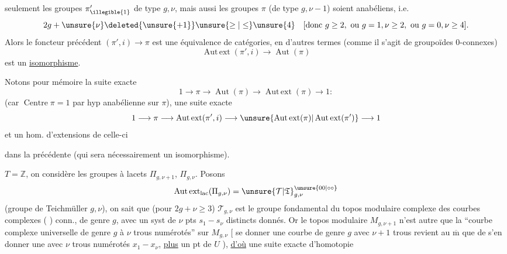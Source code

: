 
seulement les groupes \(\pi'_{\illegible{1}}\) de type \(g,\nu\), mais aussi les groupes \(\pi\) (de type \(g,\nu-1\)) soient anabéliens, i.e.
\[
2g+\unsure{\nu}\deleted{\unsure{+1}}\unsure{\ge|\le}\unsure{4}
\quad
[\text{donc }g\ge2,\ \text{ou }g=1,\nu\ge2,\ \text{ou }g=0,\nu\ge4].
\]
Alors le foncteur précédent \((\pi',i)\longrightarrow\pi\) est une équivalence de catégories, en d'autres termes (comme il s'agit de groupoïdes \(0\)-connexes)
\[
\operatorname{Aut\,ext}(\pi',i)\longrightarrow\operatorname{Aut}(\pi)
\]
est un \uline{isomorphisme}.

Notons pour mémoire la suite exacte
\[
1\longrightarrow\pi\longrightarrow\operatorname{Aut}(\pi)
\longrightarrow\operatorname{Aut\,ext}(\pi)\longrightarrow1:
\]
(car \(\operatorname{Centre}\pi=1\) par hyp anabélienne sur \(\pi\)),  une suite exacte
\[
1\longrightarrow\pi\longrightarrow\operatorname{Aut\,ext}(\pi',i)
\longrightarrow\unsure{\operatorname{Aut\,ext}(\pi)|\operatorname{Aut\,ext}(\pi')}
\longrightarrow1
\]
et un hom. d'extensions de celle-ci


dans la précédente (qui sera nécessairement un isomorphisme).

 \(T=\mathbb Z\), on considère les groupes à lacets  \(\Pi_{g,\nu+1}\), \(\Pi_{g,\nu}\). Posons
\[
\operatorname{Aut\,ext}_{\mathrm{lac}}(\Pi_{g,\nu})
=\unsure{\mathcal T|\mathfrak T}_{g,\nu}^{\unsure{00|\circ\circ}}
\]
(groupe de Teichmüller  \(g,\nu\)),
on sait que (pour \(2g+\nu\ge3\)) \(\mathcal T_{g,\nu}\) est le groupe fondamental du topos modulaire complexe  des courbes complexes ( ) conn., de genre \(g\), avec un syst de \(\nu\) pts \(s_1-\!s_\nu\) distincts donnés.
Or le topos modulaire \(M_{g,\nu+1}\) n'est autre que  la ``courbe complexe universelle  de genre \(g\) à \(\nu\) trous numérotés'' sur \(M_{g,\nu}\)
[ se donner une courbe  de genre \(g\) avec \(\nu+1\) trous  revient au \(\overline{\mathrm m}\) que de s'en donner une  avec \(\nu\) trous numérotés \(x_1-\!x_\nu\), \uline{plus} un  pt de \(U\) ), \uline{d'où} une suite exacte d'homotopie

